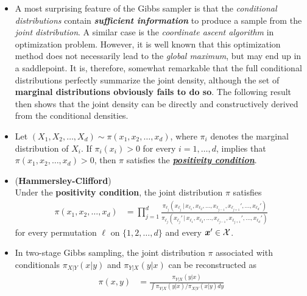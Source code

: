\documentclass[11pt]{article}
\begin{document}
\begin{itemize}
\item A most surprising feature of the Gibbs sampler is that the \emph{conditional distributions} contain \emph{\textbf{sufficient information}} to produce a sample from the \emph{joint distribution}. A similar case is the \emph{coordinate ascent algorithm} in optimization problem. However, it is well known that this optimization method does not necessarily lead to the \emph{global maximum}, but may end up in a saddlepoint. It is, therefore, somewhat remarkable that the full conditional distributions perfectly summarize the joint density, although the set of \textbf{marginal distributions obviously fails to do so}. The following result then shows that the joint density can be directly and constructively derived from the conditional densities.

\item \begin{definition}
Let $(X_1, X_2, \ldots, X_d) \sim \pi(x_1, x_2, \ldots, x_d)$, where $\pi_i$ denotes the marginal distribution of $X_i$. If $\pi_i(x_i) > 0$ for every $i = 1, \ldots, d$, implies that $\pi(x_1, x_2, \ldots, x_d) > 0$, then $\pi$ satisfies the \underline{\emph{\textbf{positivity condition}}}.
\end{definition}

\item \begin{theorem} (\textbf{Hammersley-Clifford})\\
Under the \textbf{positivity condition}, the joint distribution $\pi$ satisfies 
\begin{align}
\pi(x_1, x_2, \ldots, x_d) &= \prod_{j=1}^{d}\frac{\pi_{\ell_{j}}(x_{\ell_j}\,|\, x_{\ell_1}, x_{\ell_2}, \ldots, x_{\ell_{j-1}}, x_{\ell_{j+1}}', \ldots, x_{\ell_{d}}') }{\pi_{\ell_{j}}(x_{\ell_j}'\,|\, x_{\ell_1}, x_{\ell_2}, \ldots, x_{\ell_{j-1}}, x_{\ell_{j+1}}', \ldots, x_{\ell_{d}}') } \label{eqn: hammersley_clifford}
\end{align}
for every permutation $\ell$ on $\{1, 2, \ldots ,d\}$ and every $\boldsymbol{x}' \in {\mathcal X}$.
\end{theorem}

\item In two-stage Gibbs sampling, the joint distribution $\pi$ associated with conditionals $\pi_{X|Y}(x|y)$ and $\pi_{Y|X}(y|x)$ can be reconstructed as 
\begin{align*}
\pi(x, y) &= \frac{\pi_{Y|X}(y|x)}{\int \pi_{Y|X}(y|x)/\pi_{X|Y}(x|y) dy}
\end{align*}
\end{itemize}
\end{document}
